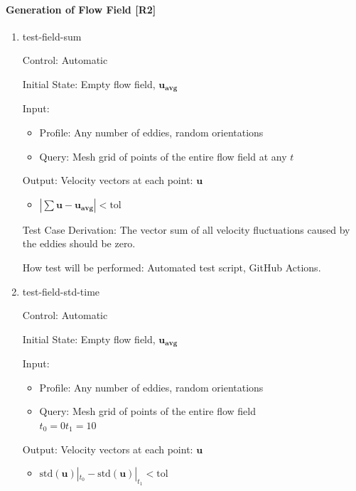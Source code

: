 \documentclass[12pt, titlepage]{article}
\begin{document}
\paragraph{Generation of Flow Field [R2]}

\begin{enumerate}

  \item{test-field-sum\\}

  Control: Automatic
            
  Initial State: Empty flow field, $\mathbf{u_{avg}}$
            
  Input:
  \begin{itemize}
    \item Profile: Any number of eddies, random orientations
    \item Query: Mesh grid of points of the entire flow field at any $t$
  \end{itemize}
  Output: Velocity vectors at each point: $\mathbf{u}$
  \begin{itemize}
    \item $|\sum\mathbf{u}-\mathbf{u_{avg}}| < \text{tol}$
  \end{itemize}

  Test Case Derivation: The vector sum of all velocity fluctuations caused by the eddies should be zero.
            
  How test will be performed: Automated test script, GitHub Actions.

  \item{test-field-std-time\\}

  Control: Automatic
            
  Initial State: Empty flow field, $\mathbf{u_{avg}}$
            
  Input:
  \begin{itemize}
    \item Profile: Any number of eddies, random orientations
    \item Query: Mesh grid of points of the entire flow field\\
    $t_0=0$\tab$t_1=10$
  \end{itemize}
  Output: Velocity vectors at each point: $\mathbf{u}$
  \begin{itemize}
    \item $\text{std}(\mathbf{u})|_{t_0} - \text{std}(\mathbf{u})|_{t_1} < \text{tol}$
  \end{itemize}


\end{enumerate}
\end{document}
